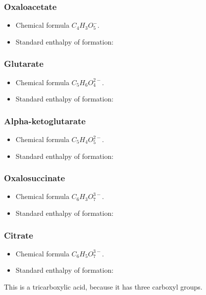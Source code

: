 \documentclass{article}
\begin{document}
\subsubsection{Oxaloacetate}
\begin{itemize}
    \item Chemical formula $C_4H_3O_5^-$.
    \item Standard enthalpy of formation:
\end{itemize}

\subsubsection{Glutarate}
\begin{itemize}
    \item Chemical formula $C_5H_6O_4^{2-}$.
    \item Standard enthalpy of formation:
\end{itemize}

\subsubsection{Alpha-ketoglutarate}
\begin{itemize}
    \item Chemical formula $C_5H_4O_5^{2-}$.
    \item Standard enthalpy of formation:
\end{itemize}

\subsubsection{Oxalosuccinate}
\begin{itemize}
    \item Chemical formula $C_6H_3O_7^{3-}$.
    \item Standard enthalpy of formation:
\end{itemize}

\subsubsection{Citrate}
\begin{itemize}
    \item Chemical formula $C_6H_5O_7^{3-}$.
    \item Standard enthalpy of formation:
\end{itemize}
This is a tricarboxylic acid, because it has three carboxyl groups.
\end{document}
